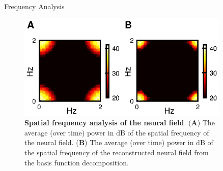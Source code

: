 \documentclass[final]{beamer}
\newlength{\sepwid}
\newlength{\onecolwid}
\begin{document}
\begin{frame}[t]
\begin{columns}[t]
\begin{column}{\onecolwid}
    \end{column}



  \begin{column}{\sepwid}\end{column}			%
	\begin{column}{\onecolwid}

					  
      \begin{block}{Frequency Analysis}
		\begin{figure}
		\begin{center}
		\includegraphics[width=9in, scale = 10]{Figure4.eps}
		\end{center}
		\caption{{\bf Spatial frequency analysis of the neural field}. (\textbf{A}) The average (over time) power in dB of the spatial frequency of the neural field. (\textbf{B}) The average (over time) power in dB of the spatial frequency of the reconstructed neural field from the basis function decomposition.}
		\label{fig:Figure4}
		\end{figure}
\end{block}
\end{column}
\end{columns}
\end{frame}
\end{document}
